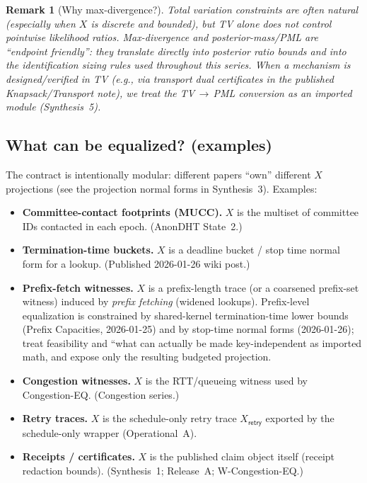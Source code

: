 \documentclass[11pt]{article}
\newtheorem{remark}{Remark}
\begin{document}
\begin{remark}[Why max-divergence?]
Total variation constraints are often natural (especially when $X$ is discrete and bounded), but TV alone does not control pointwise likelihood ratios.
Max-divergence and posterior-mass/PML are ``endpoint friendly'': they translate directly into posterior ratio bounds and into the identification sizing rules used throughout this series.\cite{series:oddsinflation,series:endpointbridge}
When a mechanism is designed/verified in TV (e.g., via transport dual certificates in the published Knapsack/Transport note\cite{series:knapsacktransport}), we treat the TV\,$\to$\,PML conversion as an imported module (Synthesis~5).
\end{remark}

\subsection{What can be equalized? (examples)}
The contract is intentionally modular: different papers ``own'' different $X$ projections (see the projection normal forms in Synthesis~3).\cite{series:traceifaces}
Examples:
\begin{itemize}[leftmargin=*]
\item \textbf{Committee-contact footprints (MUCC).} $X$ is the multiset of committee IDs contacted in each epoch. (AnonDHT State~2.)
\item \textbf{Termination-time buckets.} $X$ is a deadline bucket / stop time normal form for a lookup. (Published 2026-01-26 wiki post.)
\item \textbf{Prefix-fetch witnesses.} $X$ is a prefix-length trace (or a coarsened prefix-set witness) induced by \emph{prefix fetching} (widened lookups).
Prefix-level equalization is constrained by shared-kernel termination-time lower bounds (Prefix Capacities, 2026-01-25) and by stop-time normal forms (2026-01-26); treat feasibility and ``what can actually be made key-independent as imported math, and expose only the resulting budgeted projection.\cite{series:prefixcapacities,series:stoptimeaddendum}
\item \textbf{Congestion witnesses.} $X$ is the RTT/queueing witness used by Congestion-EQ. (Congestion series.)
\item \textbf{Retry traces.} $X$ is the schedule-only retry trace $X_{\mathsf{retry}}$ exported by the schedule-only wrapper (Operational~A).\cite{series:operationalA}
\item \textbf{Receipts / certificates.} $X$ is the published claim object itself (receipt redaction bounds). (Synthesis~1; Release~A; W-Congestion-EQ.)
\end{itemize}
\end{document}
